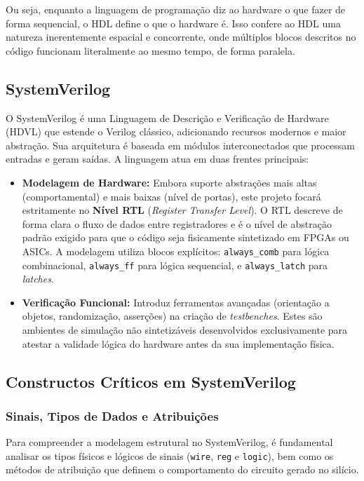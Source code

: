 \documentclass[12pt,a4paper]{article}
\begin{document}
Ou seja, enquanto a linguagem de programação diz ao hardware o que fazer de forma sequencial, o HDL define o que o hardware é. Isso confere ao HDL uma natureza inerentemente espacial e concorrente, onde múltiplos blocos descritos no código funcionam literalmente ao mesmo tempo, de forma paralela.
\newpage
\subsection{SystemVerilog}

O SystemVerilog é uma Linguagem de Descrição e Verificação de Hardware (HDVL) que estende o Verilog clássico, adicionando recursos modernos e maior abstração. Sua arquitetura é baseada em módulos interconectados que processam entradas e geram saídas. A linguagem atua em duas frentes principais:

\begin{itemize}
    \item \textbf{Modelagem de Hardware:} Embora suporte abstrações mais altas (comportamental) e mais baixas (nível de portas), este projeto focará estritamente no \textbf{Nível RTL} (\textit{Register Transfer Level}). O RTL descreve de forma clara o fluxo de dados entre registradores e é o nível de abstração padrão exigido para que o código seja fisicamente sintetizado em FPGAs ou ASICs. A modelagem utiliza blocos explícitos: \texttt{always\_comb} para lógica combinacional, \texttt{always\_ff} para lógica sequencial, e \texttt{always\_latch} para \textit{latches}.
    
    \item \textbf{Verificação Funcional:} Introduz ferramentas avançadas (orientação a objetos, randomização, asserções) na criação de \textit{testbenches}. Estes são ambientes de simulação não sintetizáveis desenvolvidos exclusivamente para atestar a validade lógica do hardware antes da sua implementação física.
\end{itemize}

\subsection{Constructos Críticos em SystemVerilog}

\subsubsection{Sinais, Tipos de Dados e Atribuições}
Para compreender a modelagem estrutural no SystemVerilog, é fundamental analisar os tipos físicos e lógicos de sinais (\texttt{wire}, \texttt{reg} e \texttt{logic}), bem como os métodos de atribuição que definem o comportamento do circuito gerado no silício.
\end{document}
